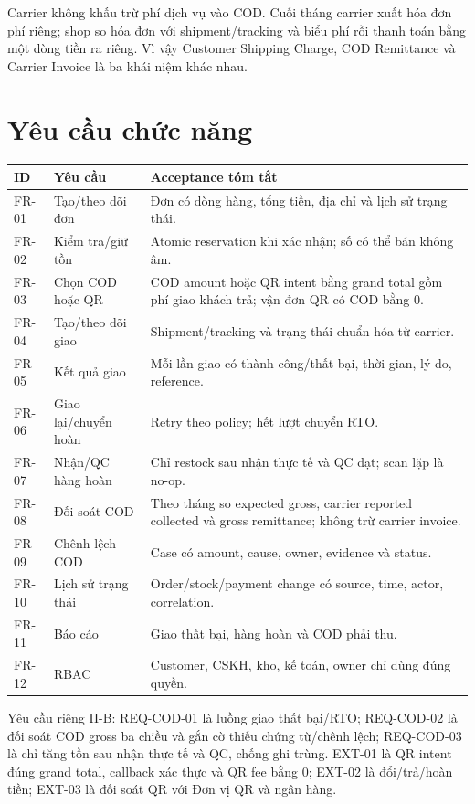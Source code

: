 \documentclass[12pt,a4paper]{report}
\begin{document}
Carrier không khấu trừ phí dịch vụ vào COD. Cuối tháng carrier xuất hóa đơn phí riêng; shop so hóa đơn với shipment/tracking và biểu phí rồi thanh toán bằng một dòng tiền ra riêng. Vì vậy Customer Shipping Charge, COD Remittance và Carrier Invoice là ba khái niệm khác nhau.

\section{Yêu cầu chức năng}
\begin{longtable}{p{}p{}p{}}
\toprule
\textbf{ID} & \textbf{Yêu cầu} & \textbf{Acceptance tóm tắt}\\
\midrule\endhead
FR-01 & Tạo/theo dõi đơn & Đơn có dòng hàng, tổng tiền, địa chỉ và lịch sử trạng thái.\\
FR-02 & Kiểm tra/giữ tồn & Atomic reservation khi xác nhận; số có thể bán không âm.\\
FR-03 & Chọn COD hoặc QR & COD amount hoặc QR intent bằng grand total gồm phí giao khách trả; vận đơn QR có COD bằng 0.\\
FR-04 & Tạo/theo dõi giao & Shipment/tracking và trạng thái chuẩn hóa từ carrier.\\
FR-05 & Kết quả giao & Mỗi lần giao có thành công/thất bại, thời gian, lý do, reference.\\
FR-06 & Giao lại/chuyển hoàn & Retry theo policy; hết lượt chuyển RTO.\\
FR-07 & Nhận/QC hàng hoàn & Chỉ restock sau nhận thực tế và QC đạt; scan lặp là no-op.\\
FR-08 & Đối soát COD & Theo tháng so expected gross, carrier reported collected và gross remittance; không trừ carrier invoice.\\
FR-09 & Chênh lệch COD & Case có amount, cause, owner, evidence và status.\\
FR-10 & Lịch sử trạng thái & Order/stock/payment change có source, time, actor, correlation.\\
FR-11 & Báo cáo & Giao thất bại, hàng hoàn và COD phải thu.\\
FR-12 & RBAC & Customer, CSKH, kho, kế toán, owner chỉ dùng đúng quyền.\\
\bottomrule
\end{longtable}

Yêu cầu riêng II-B: REQ-COD-01 là luồng giao thất bại/RTO; REQ-COD-02 là đối soát COD gross ba chiều và gắn cờ thiếu chứng từ/chênh lệch; REQ-COD-03 là chỉ tăng tồn sau nhận thực tế và QC, chống ghi trùng. EXT-01 là QR intent đúng grand total, callback xác thực và QR fee bằng 0; EXT-02 là đổi/trả/hoàn tiền; EXT-03 là đối soát QR với Đơn vị QR và ngân hàng.
\end{document}
